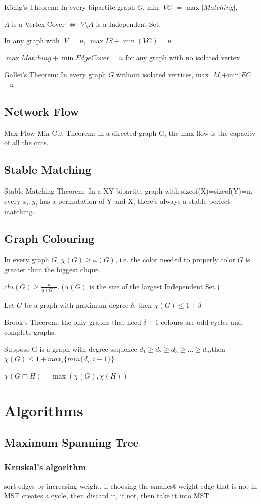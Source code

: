 \documentclass[12pt,a4paper]{ctexrep}
\begin{document}
K\"{o}nig's Theorem: In every bipartite graph $G$, min $|VC|=$ max $|Matching|$.

$A$ is a Vertex Cover $\iff$ $V \setminus A$ is a Independent Set.

In any graph with $|V|=n$, $\max{IS}+\min(VC)=n$

$\max{Matching}+\min{Edge Cover}=n$ for any graph with no isolated vertex.

Gallei's Theorem: In every graph $G$ without isolated vertices, max $|M|$+min$|EC|$=$n$
\subsection{Network Flow}
Max Flow Min Cut Theorem: in a directed graph G, the max flow is the capacity of all the cuts.
\subsection{Stable Matching}
Stable Matching Theorem: In a XY-bipartite graph with sizeof(X)=sizeof(Y)=n, every $x_{i},y_{i}$ has a permutation of Y and X, there's always a stable perfect matching.
\subsection{Graph Colouring}
In every graph $G$, $\chi(G) \geq \omega(G)$, i.e. the color needed to properly color $G$ is greater than the biggest clique.

$chi(G)\geq \frac{n}{\alpha(G)}$. ($\alpha(G)$ is the size of the largest Independent Set.)

Let $G$ be a graph with maximum degree $\delta$, then $\chi(G) \leq 1+\delta$

Brook's Theorem: the only graphs that need $\delta +1$ colours are odd cycles and complete graphs.\

Suppose G is a graph with degree sequence $d_{1}\geq d_{2} \geq d_{3} \geq \dots \geq d_{n}$,then $\chi(G) \leq 1+max_{i}\{min\{d_{i},i-1\}\}$

$\chi(G\Box H)=\max(\chi(G),\chi(H))$
\section{Algorithms}
\subsection{Maximum Spanning Tree}
\subsubsection{Kruskal's algorithm}
sort edges by increasing weight, if choosing the smallest-weight edge that is not in MST creates a cycle, then discard it, if not, then take it into MST.
\end{document}
